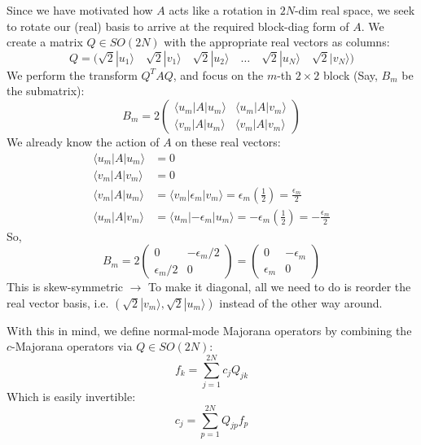 \documentclass[11pt,a4paper]{article}
\begin{document}
\vspace{0.5cm}
Since we have motivated how $A$ acts like a rotation in $2N$-dim real space, we seek to rotate our (real) basis to arrive at the required block-diag form of $A$. We create a matrix $Q \in SO(2N)$ with the appropriate real vectors as columns:
\begin{equation*}
Q = \Big( \sqrt{2}|u_1\rangle \quad \sqrt{2}|v_1\rangle \quad \sqrt{2}|u_2\rangle \quad \dots \quad \sqrt{2}|u_N\rangle \quad \sqrt{2}|v_N\rangle \Big)
\end{equation*}
We perform the transform $Q^T A Q$, and focus on the $m$-th $2\times 2$ block (Say, $B_m$ be the submatrix):
\begin{equation*}
B_m = 2 \begin{pmatrix}
\langle u_m|A|u_m\rangle & \langle u_m|A|v_m\rangle \\
\langle v_m|A|u_m\rangle & \langle v_m|A|v_m\rangle
\end{pmatrix}
\end{equation*}
We already know the action of $A$ on these real vectors:
\begin{align*}
\langle u_m|A|u_m\rangle &= 0 \\
\langle v_m|A|v_m\rangle &= 0 \\
\langle v_m|A|u_m\rangle &= \langle v_m|\epsilon_m|v_m\rangle = \epsilon_m \left(\frac{1}{2}\right) = \frac{\epsilon_m}{2} \\
\langle u_m|A|v_m\rangle &= \langle u_m|-\epsilon_m|u_m\rangle = -\epsilon_m \left(\frac{1}{2}\right) = -\frac{\epsilon_m}{2}
\end{align*}
So,
\begin{equation*}
B_m = 2 \begin{pmatrix} 0 & -\epsilon_m/2 \\ \epsilon_m/2 & 0 \end{pmatrix} = \begin{pmatrix} 0 & -\epsilon_m \\ \epsilon_m & 0 \end{pmatrix}
\end{equation*}
This is skew-symmetric $\rightarrow$ To make it diagonal, all we need to do is reorder the real vector basis, i.e. $(\sqrt{2}|v_m\rangle, \sqrt{2}|u_m\rangle)$ instead of the other way around.

With this in mind, we define normal-mode Majorana operators by combining the $c$-Majorana operators via $Q \in SO(2N)$:
\begin{equation*}
f_k = \sum_{j=1}^{2N} c_j Q_{jk}
\end{equation*}
Which is easily invertible:
\begin{equation*}
c_j = \sum_{p=1}^{2N} Q_{jp} f_p
\end{equation*}
\end{document}
